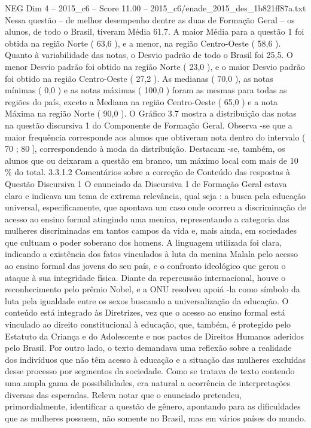 \begin{textsample}{NEG Dim 4 – 2015\_c6 – Score 11.00 – 2015\_c6/enade\_2015\_des\_1b821ff87a.txt}
Nessa questão – de melhor desempenho dentre as duas de Formação Geral – os alunos, de todo o Brasil, tiveram Média 61,7.
A maior Média para a questão 1 foi obtida na região Norte ( 63,6 ), e a menor, na região Centro-Oeste ( 58,6 ).
Quanto à variabilidade das notas, o Desvio padrão de todo o Brasil foi 25,5.
O menor Desvio padrão foi obtido na região Norte ( 23,0 ), e o maior Desvio padrão foi obtido na região Centro-Oeste ( 27,2 ).
As medianas ( 70,0 ), as notas mínimas ( 0,0 ) e as notas máximas ( 100,0 ) foram as mesmas para todas as regiões do país, exceto a Mediana na região Centro-Oeste ( 65,0 ) e a nota Máxima na região Norte ( 90,0 ).
O Gráfico 3.7 mostra a distribuição das notas na questão discursiva 1 do Componente de Formação Geral.
Observa -se que a maior frequência corresponde aos alunos que obtiveram nota dentro do intervalo ( 70 ; 80 ], correspondendo à moda da distribuição.
Destacam -se, também, os alunos que ou deixaram a questão em branco, um máximo local com mais de 10 \% do total. 3.3.1.2 Comentários sobre a correção de Conteúdo das respostas à Questão Discursiva 1 O enunciado da Discursiva 1 de Formação Geral estava claro e indicava um tema de extrema relevância, qual seja : a busca pela educação universal, especificamente, que apontava um caso onde ocorreu a discriminação de acesso ao ensino formal atingindo uma menina, representando a categoria das mulheres discriminadas em tantos campos da vida e, mais ainda, em sociedades que cultuam o poder soberano dos homens.
A linguagem utilizada foi clara, indicando a existência dos fatos vinculados à luta da menina Malala pelo acesso ao ensino formal das jovens do seu país, e o confronto ideológico que gerou o ataque à sua integridade física.
Diante da repercussão internacional, houve o reconhecimento pelo prêmio Nobel, e a ONU resolveu apoiá -la como símbolo da luta pela igualdade entre os sexos buscando a universalização da educação.
O conteúdo está integrado às Diretrizes, vez que o acesso ao ensino formal está vinculado ao direito constitucional à educação, que, também, é protegido pelo Estatuto da Criança e do Adolescente e nos pactos de Direitos Humanos aderidos pelo Brasil.
Por outro lado, o texto demandava uma reflexão sobre a realidade dos indivíduos que não têm acesso à educação e a situação das mulheres excluídas desse processo por segmentos da sociedade.
Como se tratava de texto contendo uma ampla gama de possibilidades, era natural a ocorrência de interpretações diversas das esperadas.
Releva notar que o enunciado pretendeu, primordialmente, identificar a questão de gênero, apontando para as dificuldades que as mulheres possuem, não somente no Brasil, mas em vários países do mundo.

\end{textsample}
